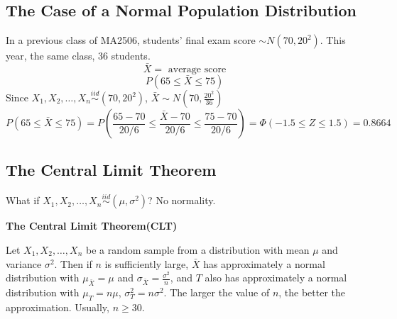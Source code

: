 \subsection{The Case of a Normal Population Distribution}
\begin{exmp}
In a previous class of MA2506, students' final exam score $\sim N(70,20^2)$. This year, the same class, 36 students.
\[\bar{X}=\text{ average score}\]
\[P(65 \leq \bar{X} \leq 75)\]
Since $X_1, X_2, \dots , X_n \overset{iid}{\sim}(70,20^2)$, 
$\bar{X}\sim N(70,\frac{20^2}{36})$
\[P(65 \leq \bar{X} \leq 75)=P\left(\frac{65-70}{20/6} \leq \frac{\bar{X}-70}{20/6} \leq \frac{75-70}{20/6}\right)=\Phi(-1.5 \leq Z \leq 1.5)=0.8664\]
\end{exmp}

\subsection{The Central Limit Theorem}
What if $X_1, X_2, \dots , X_n \overset{iid}{\sim}(\mu,\sigma^2)$? No normality.
\begin{theo}
\textbf{The Central Limit Theorem(CLT)}

Let $X_1, X_2, \dots , X_n$ be a random sample from a distribution with mean $\mu$ and variance $\sigma^2$. Then if $n$ is sufficiently large, $\bar{X}$ has approximately a normal distribution with $\mu_{\bar{X}}=\mu$ and $\sigma_{\bar{X}}=\frac{\sigma^2}{n}$, and $T$ also has approximately a normal distribution with $\mu_{T}=n \mu$, $\sigma_{T}^2=n \sigma^2$. The larger the value of $n$, the better the approximation. Usually, $n \geq 30$.
\end{theo}